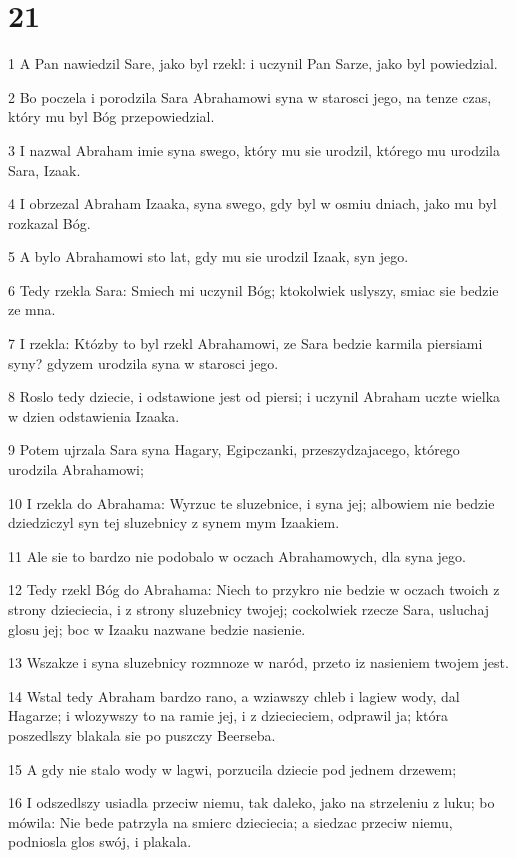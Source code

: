 \chapter{21}

\par 1 A Pan nawiedzil Sare, jako byl rzekl: i uczynil Pan Sarze, jako byl powiedzial.
\par 2 Bo poczela i porodzila Sara Abrahamowi syna w starosci jego, na tenze czas, który mu byl Bóg przepowiedzial.
\par 3 I nazwal Abraham imie syna swego, który mu sie urodzil, którego mu urodzila Sara, Izaak.
\par 4 I obrzezal Abraham Izaaka, syna swego, gdy byl w osmiu dniach, jako mu byl rozkazal Bóg.
\par 5 A bylo Abrahamowi sto lat, gdy mu sie urodzil Izaak, syn jego.
\par 6 Tedy rzekla Sara: Smiech mi uczynil Bóg; ktokolwiek uslyszy, smiac sie bedzie ze mna.
\par 7 I rzekla: Któzby to byl rzekl Abrahamowi, ze Sara bedzie karmila piersiami syny? gdyzem urodzila syna w starosci jego.
\par 8 Roslo tedy dziecie, i odstawione jest od piersi; i uczynil Abraham uczte wielka w dzien odstawienia Izaaka.
\par 9 Potem ujrzala Sara syna Hagary, Egipczanki, przeszydzajacego, którego urodzila Abrahamowi;
\par 10 I rzekla do Abrahama: Wyrzuc te sluzebnice, i syna jej; albowiem nie bedzie dziedziczyl syn tej sluzebnicy z synem mym Izaakiem.
\par 11 Ale sie to bardzo nie podobalo w oczach Abrahamowych, dla syna jego.
\par 12 Tedy rzekl Bóg do Abrahama: Niech to przykro nie bedzie w oczach twoich z strony dzieciecia, i z strony sluzebnicy twojej; cockolwiek rzecze Sara, usluchaj glosu jej; boc w Izaaku nazwane bedzie nasienie.
\par 13 Wszakze i syna sluzebnicy rozmnoze w naród, przeto iz nasieniem twojem jest.
\par 14 Wstal tedy Abraham bardzo rano, a wziawszy chleb i lagiew wody, dal Hagarze; i wlozywszy to na ramie jej, i z dziecieciem, odprawil ja; która poszedlszy blakala sie po puszczy Beerseba.
\par 15 A gdy nie stalo wody w lagwi, porzucila dziecie pod jednem drzewem;
\par 16 I odszedlszy usiadla przeciw niemu, tak daleko, jako na strzeleniu z luku; bo mówila: Nie bede patrzyla na smierc dzieciecia; a siedzac przeciw niemu, podniosla glos swój, i plakala.
